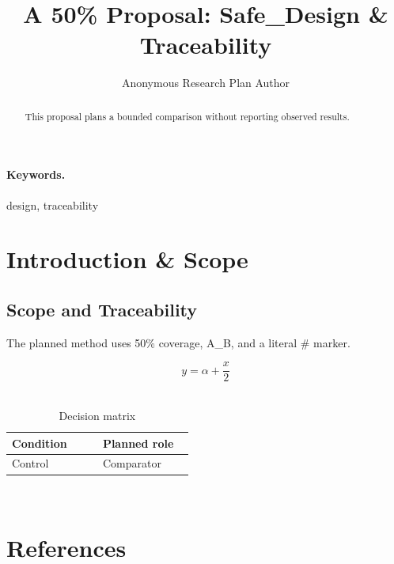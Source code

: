 \documentclass{article}
\title{A 50\% Proposal: Safe\_Design \& Traceability}
\author{Anonymous Research Plan Author}
\begin{document}
\maketitle
\begin{abstract}
This proposal plans a bounded comparison without reporting observed results.
\end{abstract}
\paragraph{Keywords.} design, traceability
\section{Introduction \& Scope}
\subsection{Scope and Traceability}
The planned method uses 50\% coverage, A\_B, and a literal \# marker.~\cite{cite_example_1}

\begin{equation}
y = \alpha + \frac{x}{2}
\label{eq:introduction-B2}
\end{equation}~\cite{cite_example_1}

\begin{table}[htbp]
\centering
\small


\caption{Decision matrix}
\label{tab:introduction-B3}
\begin{tabular}{|p{0.45\linewidth}|p{0.45\linewidth}|}
\hline
Condition & Planned role \\\hline
Control & Comparator \\\hline
\end{tabular}
\end{table}~\cite{cite_example_1}
\section*{References}


\end{document}
